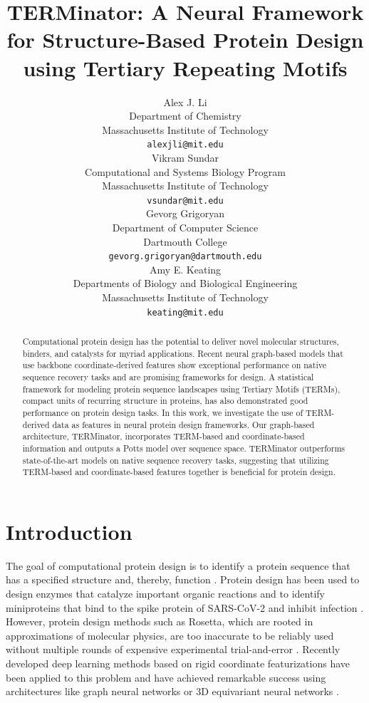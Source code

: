 \documentclass{article}
\title{TERMinator: A Neural Framework for Structure-Based Protein Design using Tertiary Repeating Motifs}
\author{%
  Alex J. Li \\
  Department of Chemistry\\
  Massachusetts Institute of Technology\\
  \texttt{alexjli@mit.edu} \\
  \And
  Vikram Sundar \\
  Computational and Systems Biology Program \\
  Massachusetts Institute of Technology \\
  \texttt{vsundar@mit.edu} \\
  \And
  Gevorg Grigoryan \\
  Department of Computer Science\\
  Dartmouth College\\
  \texttt{gevorg.grigoryan@dartmouth.edu} \\
  \And
  Amy E. Keating\\
  Departments of Biology and Biological Engineering\\
  Massachusetts Institute of Technology\\
  \texttt{keating@mit.edu} \\
}
\begin{document}
\maketitle

\begin{abstract}
    Computational protein design has the potential to deliver novel molecular structures, binders, and catalysts for myriad applications. Recent neural graph-based models that use backbone coordinate-derived features show exceptional performance on native sequence recovery tasks and are promising frameworks for design. A statistical framework for modeling protein sequence landscapes using Tertiary Motifs (TERMs), compact units of recurring structure in proteins, has also demonstrated good performance on protein design tasks. In this work, we investigate the use of TERM-derived data as features in neural protein design frameworks. Our graph-based architecture, TERMinator,  incorporates TERM-based and coordinate-based information and outputs a Potts model over sequence space. TERMinator outperforms state-of-the-art models on native sequence recovery tasks, suggesting that utilizing TERM-based and coordinate-based features together is beneficial for protein design. 
\end{abstract}

\section{Introduction}

The goal of computational protein design is to identify a protein sequence that has a specified structure and, thereby, function \cite{Frappier2021}. Protein design has been used to design enzymes that catalyze important organic reactions \citep{Siegel2010} and to identify miniproteins that bind to the spike protein of SARS-CoV-2 and inhibit infection \citep{Cao2020}. However, protein design methods such as Rosetta, which are rooted in approximations of molecular physics, are too inaccurate to be reliably used without multiple rounds of expensive experimental trial-and-error \citep{Ingraham2019, Frappier2021}. Recently developed deep learning methods based on rigid coordinate featurizations have been applied to this problem and have achieved remarkable success using architectures like graph neural networks \citep{Ingraham2019} or 3D equivariant neural networks \citep{Jing2021}.

\end{document}
